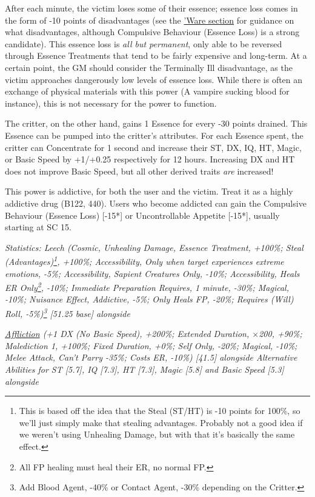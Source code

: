 \begin{multicols*}{3}
	After each minute, the victim loses some of their essence; essence loss comes in the form of -10 points of disadvantages (see the \hyperref[ware]{'Ware section} for guidance on what disadvantages, although Compulsive Behaviour (Essence Loss) is a strong candidate). This essence loss is \textit{all but permanent}, only able to be reversed through Essence Treatments that tend to be fairly expensive and long-term. At a certain point, the GM should consider the Terminally Ill disadvantage, as the victim approaches dangerously low levels of essence loss. While there is often an exchange of physical materials with this power (A vampire sucking blood for instance), this is not necessary for the power to function.
	
	The critter, on the other hand, gains 1 Essence for every -30 points drained. This Essence can be pumped into the critter's attributes. For each Essence spent, the critter can Concentrate for 1 second and increase their ST, DX, IQ, HT, Magic, or Basic Speed by +1/+0.25 respectively for 12 hours. Increasing DX and HT does not improve Basic Speed, but all other derived traits \textit{are} increased!
	
	This power is addictive, for both the user and the victim. Treat it as a highly addictive drug (B122, 440). Users who become addicted can gain the Compulsive Behaviour (Essence Loss) [-15*] or Uncontrollable Appetite [-15*], usually starting at SC 15.
	
	\textcolor{OliveGreen}{\textit{Statistics: Leech (Cosmic, Unhealing Damage, Essence Treatment, +100\%; Steal (Advantages)\footnote{This is based off the idea that the Steal (ST/HT) is -10 points for 100\%, so we'll just simply make that stealing advantages. Probably not a good idea if we weren't using Unhealing Damage, but with that it's basically the same effect.}, +100\%; Accessibility, Only when target experiences extreme emotions, -5\%; Accessibility, Sapient Creatures Only, -10\%; Accessibility, Heals ER Only\footnote{All FP healing must heal their ER, no normal FP.}, -10\%; Immediate Preparation Requires, 1 minute, -30\%; Magical, -10\%; Nuisance Effect, Addictive, -5\%; Only Heals FP, -20\%; Requires (Will) Roll, -5\%)\footnote{Add Blood Agent, -40\% or Contact Agent, -30\% depending on the Critter.} [51.25 base] alongside}}
			
	 \textcolor{OliveGreen}{\textit{\textcolor{Blue}{\href{http://forums.sjgames.com/showthread.php?t=152300}{Affliction}} (+1 DX (No Basic Speed), +200\%; Extended Duration, $\times$200, +90\%; Malediction 1, +100\%; Fixed Duration, +0\%; Self Only, -20\%; Magical, -10\%; Melee Attack, Can't Parry -35\%; Costs ER, -10\%) [41.5] alongside Alternative Abilities for ST [5.7], IQ [7.3], HT [7.3], Magic [5.8] and Basic Speed [5.3] alongside}}
	 

\end{multicols*}
